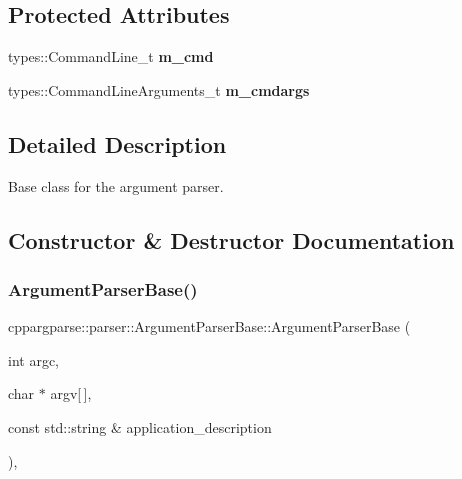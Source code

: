 \subsection*{Protected Attributes}
\begin{DoxyCompactItemize}
\item 
\mbox{\label{classcppargparse_1_1parser_1_1ArgumentParserBase_ab61aac285e831ef24598191816bed84d}} 
types\+::\+Command\+Line\+\_\+t {\bfseries m\+\_\+cmd}
\item 
\mbox{\label{classcppargparse_1_1parser_1_1ArgumentParserBase_ac6fd162f8dfee569bb281ae5ef576d38}} 
types\+::\+Command\+Line\+Arguments\+\_\+t {\bfseries m\+\_\+cmdargs}
\end{DoxyCompactItemize}


\subsection{Detailed Description}
Base class for the argument parser. 

\subsection{Constructor \& Destructor Documentation}
\mbox{\label{classcppargparse_1_1parser_1_1ArgumentParserBase_a91c5c101e21966fb8c04c094b04b8ba3}} 
\subsubsection{\texorpdfstring{Argument\+Parser\+Base()}{ArgumentParserBase()}}
{\footnotesize\ttfamily cppargparse\+::parser\+::\+Argument\+Parser\+Base\+::\+Argument\+Parser\+Base (\begin{DoxyParamCaption}\item[{int}]{argc,  }\item[{char $\ast$}]{argv\mbox{[}$\,$\mbox{]},  }\item[{const std\+::string \&}]{application\+\_\+description }\end{DoxyParamCaption})\hspace{0.3cm}{\ttfamily [inline]}, {\ttfamily [explicit]}}



